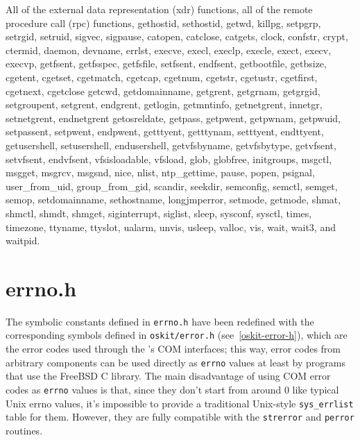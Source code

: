 All of the external data representation (xdr) functions, all of the remote
procedure call (rpc) functions, gethostid, sethostid, getwd, killpg,
setpgrp, setrgid, setruid, sigvec, sigpause, catopen, catclose, catgets,
clock, confstr, crypt, ctermid, daemon, devname, errlst, execve, execl,
execlp, execle, exect, execv, execvp, getfsent, getfsspec, getfsfile,
setfsent, endfsent, getbootfile, getbsize, cgetent, cgetset, cgetmatch,
cgetcap, cgetnum, cgetstr, cgetustr, cgetfirst, cgetnext, cgetclose getcwd,
getdomainname, getgrent, getgrnam, getgrgid, setgroupent, setgrent,
endgrent, getlogin, getmntinfo, getnetgrent, innetgr, setnetgrent,
endnetgrent getosreldate, getpass, getpwent, getpwnam, getpwuid,
setpassent, setpwent, endpwent, getttyent, getttynam, setttyent, endttyent,
getusershell, setusershell, endusershell, getvfsbyname, getvfsbytype,
getvfsent, setvfsent, endvfsent, vfsisloadable, vfsload, glob, globfree,
initgroups, msgctl, msgget, msgrcv, msgsnd, nice, nlist, ntp_gettime,
pause, popen, psignal, user_from_uid, group_from_gid, scandir, seekdir,
semconfig, semctl, semget, semop, setdomainname, sethostname, longjmperror,
setmode, getmode, shmat, shmctl, shmdt, shmget, siginterrupt, siglist,
sleep, sysconf, sysctl, times, timezone, ttyname, ttyslot, ualarm, unvis,
usleep, valloc, vis, wait, wait3, and waitpid.

\section{errno.h}

The symbolic constants defined in {\tt errno.h} have been redefined with
the corresponding symbols defined in \texttt{oskit/error.h}
(see~\ref{oskit-error-h}), which are the error codes used through the \oskit's
COM interfaces; this way, error codes from arbitrary \oskit{} components
can be used directly as \texttt{errno} values at least by programs that use
the FreeBSD C library. The main disadvantage of using COM error codes as
\texttt{errno} values is that, since they don't start from around 0 like
typical Unix errno values, it's impossible to provide a traditional
Unix-style \texttt{sys_errlist} table for them.  However, they are fully
compatible with the \texttt{strerror} and \texttt{perror} routines.


